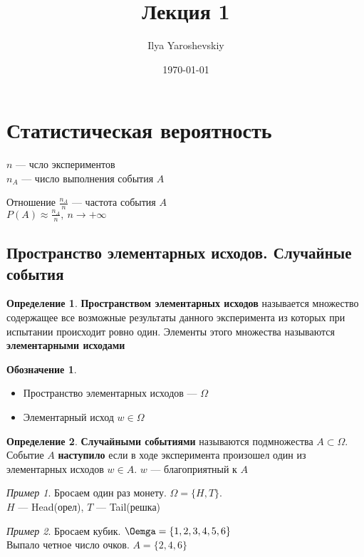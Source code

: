 \documentclass[english]{article}
\author{Ilya Yaroshevskiy}
\date{\today}
\title{Лекция 1}
\theoremstyle{plain}
\theoremstyle{remark}
\newtheorem*{examp}{Пример}
\theoremstyle{definition}
\newtheorem*{definition}{Определение}
\newtheorem*{symb}{Обозначение}
\begin{document}
\maketitle
\tableofcontents


\section{Статистическая вероятность}
\label{sec:org5eac03d}
\(n\) --- чсло экспериментов \\
\(n_A\) --- число выполнения события \(A\)
\begin{defintion}
Отношение \(\frac{n_A}{n}\) --- частота события \(A\) \\
\(P(A) \approx \frac{n_A}{n},\ n\to+\infty\)
\end{defintion}
\subsection{Пространство элементарных исходов. Случайные события}
\label{sec:orgeda4fe0}
\begin{definition}
\textbf{Пространством элементарных исходов} называется множество
содержащее все возможные результаты данного эксперимента из которых при
испытании происходит ровно один. Элементы этого множества называются \textbf{элементарными исходами}
\end{definition}
\begin{symb}
\-
\begin{itemize}
\item Пространство элементарных исходов --- \(\Omega\)
\item Элементарный исход \(w \in \Omega\)
\end{itemize}
\end{symb}
\begin{definition}
\textbf{Случайными событиями} называются подмножества \(A \subset \Omega\). Событие \(A\) \textbf{наступило} если в ходе эксперимента
произошел один из элементарных исходов \(w \in A\). \(w\) --- благоприятный к \(A\)
\end{definition}
\begin{examp}
Бросаем один раз монету. \(\Omega = \{H, T\}\). \\
\color{gray}
\(H\) --- Head(орел), \(T\) --- Tail(решка)
\end{examp}
\begin{examp}
Бросаем кубик. \(\Oemga = \{1, 2, 3, 4, 5, 6\}\) \\
Выпало четное число очков. \(A = \{2, 4, 6\}\)
\end{examp}
\end{document}
